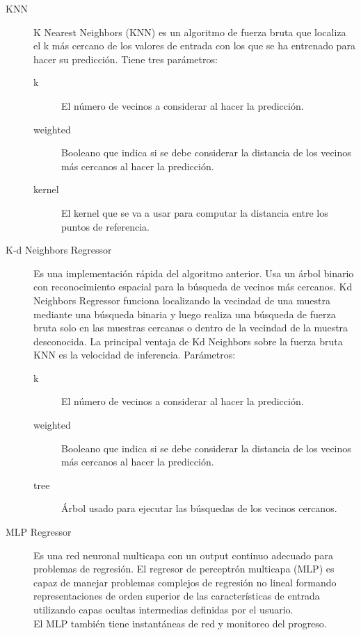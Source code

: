 \begin{description}
	\item [KNN] K Nearest Neighbors (KNN) es un algoritmo de fuerza bruta que localiza el k más cercano de los valores de entrada con los que se ha entrenado para hacer su predicción. Tiene tres parámetros:
	\begin{description}
	    \item[k] El número de vecinos a considerar al hacer la predicción.
	    \item[weighted] Booleano que indica si se debe considerar la distancia de los vecinos más cercanos al hacer la predicción.
	    \item[kernel] El kernel que se va a usar para computar la distancia entre los puntos de referencia.
	\end{description}
	\item[K-d Neighbors Regressor] Es una implementación rápida del algoritmo anterior. Usa un árbol binario con reconocimiento espacial para la búsqueda de vecinos más cercanos. Kd Neighbors Regressor funciona localizando la vecindad de una muestra mediante una búsqueda binaria y luego realiza una búsqueda de fuerza bruta solo en las muestras cercanas o dentro de la vecindad de la muestra desconocida.  La principal ventaja de Kd Neighbors sobre la fuerza bruta KNN es la velocidad de inferencia. Parámetros:
	\begin{description}
	    \item[k] El número de vecinos a considerar al hacer la predicción.
	    \item[weighted] Booleano que indica si se debe considerar la distancia de los vecinos más cercanos al hacer la predicción.
	    \item[tree] Árbol usado para ejecutar las búsquedas de los vecinos cercanos.
	\end{description}
	\item [MLP Regressor] Es una red neuronal multicapa con un output continuo adecuado para problemas de regresión.  El regresor de perceptrón multicapa (MLP) es capaz de manejar problemas complejos de regresión no lineal formando representaciones de orden superior de las características de entrada utilizando capas ocultas intermedias definidas por el usuario.\\
	El MLP también tiene instantáneas de red y monitoreo del progreso.
\end{description}
